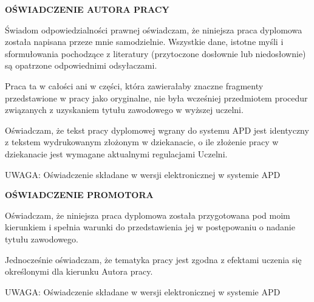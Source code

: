 \begin{center}
    \large\textbf{\MakeUppercase{OŚWIADCZENIE AUTORA PRACY}}\\
    \vspace{1cm}
\end{center}

Świadom odpowiedzialności prawnej oświadczam, że niniejsza praca dyplomowa została napisana przeze mnie samodzielnie. Wszystkie dane, istotne myśli i sformułowania pochodzące z literatury (przytoczone dosłownie lub niedosłownie) są opatrzone odpowiednimi odsyłaczami.
\par
Praca ta w całości ani w części, która zawierałaby znaczne fragmenty przedstawione w pracy jako oryginalne, nie była wcześniej przedmiotem procedur związanych z uzyskaniem tytułu zawodowego w wyższej uczelni.
\par
Oświadczam, że tekst pracy dyplomowej wgrany do systemu APD jest identyczny z tekstem wydrukowanym złożonym w dziekanacie, o ile złożenie pracy w dziekanacie jest wymagane aktualnymi regulacjami Uczelni.
\par
\vspace{1cm}
\noindent UWAGA: Oświadczenie składane w wersji elektronicznej w systemie APD

\begin{center}
    \vspace{1cm}
    \large\textbf{\MakeUppercase{OŚWIADCZENIE PROMOTORA}}\\
    \vspace{1cm}
\end{center}

Oświadczam, że niniejsza praca dyplomowa została przygotowana pod moim kierunkiem i spełnia warunki do przedstawienia jej w postępowaniu o nadanie tytułu zawodowego.
\par
Jednocześnie oświadczam, że tematyka pracy jest zgodna z efektami uczenia się określonymi dla kierunku Autora pracy.
\par
\vspace{1cm}
\noindent UWAGA: Oświadczenie składane w wersji elektronicznej w systemie APD

\thispagestyle{normal}
